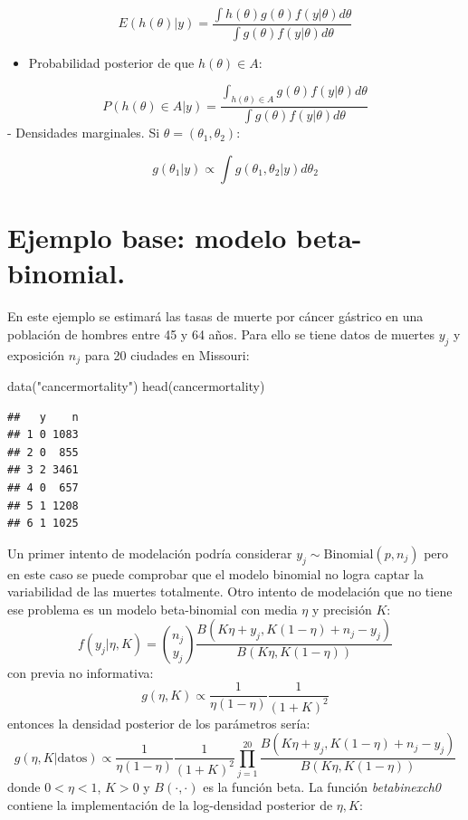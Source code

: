 \documentclass[
  12pt,
]{book}
\newenvironment{Shaded}{\begin{snugshade}}{\end{snugshade}}
\newcommand{\FunctionTok}[1]{\textcolor[rgb]{0.00,0.00,0.00}{#1}}
\newcommand{\NormalTok}[1]{#1}
\newcommand{\StringTok}[1]{\textcolor[rgb]{0.31,0.60,0.02}{#1}}
\providecommand{\tightlist}{%
  \setlength{\itemsep}{0pt}\setlength{\parskip}{0pt}}
\begin{document}
\[E(h(\theta)|y)=\frac{\int h(\theta)g(\theta)f(y|\theta) d\theta}{\int g(\theta)f(y|\theta) d\theta}\]

\begin{itemize}
\tightlist
\item
  Probabilidad posterior de que \(h(\theta) \in A\):
\end{itemize}

\[P(h(\theta) \in A|y)=\frac{\int_{h(\theta) \in A} g(\theta)f(y|\theta) d\theta}{\int g(\theta)f(y|\theta) d\theta}\]
- Densidades marginales. Si \(\theta=(\theta_1,\theta_2)\):

\[g(\theta_1|y)\propto \int g(\theta_1,\theta_2|y)d\theta_2\]

\hypertarget{ejemplo-base-modelo-beta-binomial.}{%
\section{Ejemplo base: modelo
beta-binomial.}\label{ejemplo-base-modelo-beta-binomial.}}

En este ejemplo se estimará las tasas de muerte por cáncer gástrico en
una población de hombres entre 45 y 64 años. Para ello se tiene datos de
muertes \(y_j\) y exposición \(n_j\) para 20 ciudades en Missouri:

\begin{Shaded}
\begin{Highlighting}[]
\FunctionTok{data}\NormalTok{(}\StringTok{"cancermortality"}\NormalTok{)}
\FunctionTok{head}\NormalTok{(cancermortality)}
\end{Highlighting}
\end{Shaded}

\begin{verbatim}
##   y    n
## 1 0 1083
## 2 0  855
## 3 2 3461
## 4 0  657
## 5 1 1208
## 6 1 1025
\end{verbatim}

Un primer intento de modelación podría considerar
\(y_j\sim \text{Binomial}(p,n_j)\) pero en este caso se puede comprobar
que el modelo binomial no logra captar la variabilidad de las muertes
totalmente. Otro intento de modelación que no tiene ese problema es un
modelo beta-binomial con media \(\eta\) y precisión \(K\):
\[f(y_j|\eta,K)={n_j \choose y_j}\frac{B(K\eta+y_j,K(1-\eta)+n_j-y_j)}{B(K\eta,K(1-\eta))}\]
con previa no informativa:
\[g(\eta,K)\propto \frac{1}{\eta(1-\eta)}\frac{1}{(1+K)^2}\] entonces la
densidad posterior de los parámetros sería:
\[g(\eta,K|\text{datos})\propto \frac{1}{\eta(1-\eta)}\frac{1}{(1+K)^2} \prod_{j=1}^{20}\frac{B(K\eta+y_j,K(1-\eta)+n_j-y_j)}{B(K\eta,K(1-\eta))}\]
donde \(0<\eta<1\), \(K>0\) y \(B(\cdot,\cdot)\) es la función beta. La
función \emph{betabinexch0} contiene la implementación de la
log-densidad posterior de \(\eta,K\):
\end{document}
